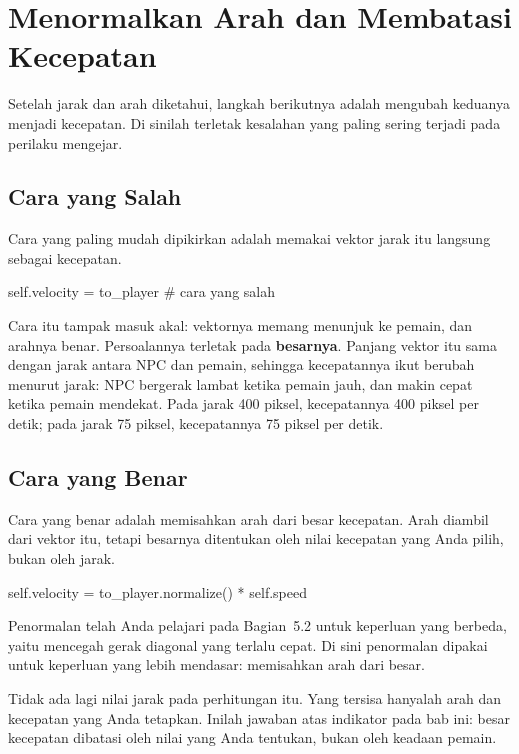 \section{Menormalkan Arah dan Membatasi Kecepatan}
\label{sec:menormalkan}

Setelah jarak dan arah diketahui, langkah berikutnya adalah mengubah keduanya
menjadi kecepatan. Di sinilah terletak kesalahan yang paling sering terjadi
pada perilaku mengejar.

\subsection{Cara yang Salah}

Cara yang paling mudah dipikirkan adalah memakai vektor jarak itu langsung
sebagai kecepatan.

\begin{kodekeluaran}
self.velocity = to_player          # cara yang salah
\end{kodekeluaran}

Cara itu tampak masuk akal: vektornya memang menunjuk ke pemain, dan arahnya
benar. Persoalannya terletak pada \textbf{besarnya}. Panjang vektor itu sama
dengan jarak antara NPC dan pemain, sehingga kecepatannya ikut berubah
menurut jarak: NPC bergerak lambat ketika pemain jauh, dan makin cepat ketika
pemain mendekat. Pada jarak 400 piksel, kecepatannya 400 piksel per detik;
pada jarak 75 piksel, kecepatannya 75 piksel per detik.

\subsection{Cara yang Benar}

Cara yang benar adalah memisahkan arah dari besar kecepatan. Arah diambil dari
vektor itu, tetapi besarnya ditentukan oleh nilai kecepatan yang Anda pilih,
bukan oleh jarak.

\begin{kodekeluaran}
self.velocity = to_player.normalize() * self.speed
\end{kodekeluaran}

Penormalan telah Anda pelajari pada Bagian~5.2 untuk keperluan yang berbeda,
yaitu mencegah gerak diagonal yang terlalu cepat. Di sini penormalan dipakai
untuk keperluan yang lebih mendasar: memisahkan arah dari besar.

Tidak ada lagi nilai jarak pada perhitungan itu. Yang tersisa
hanyalah arah dan kecepatan yang Anda tetapkan. Inilah jawaban atas indikator
 pada bab ini: besar kecepatan dibatasi oleh nilai yang Anda tentukan,
bukan oleh keadaan pemain.

